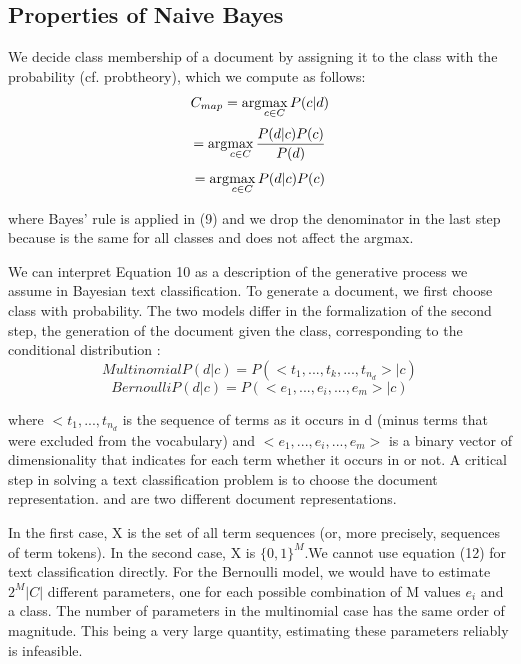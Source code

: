 \documentclass[journal]{IEEEtran}
\begin{document}
\subsection{{Properties of Naive Bayes}}
We decide class membership of a document by assigning it to the class with the probability (cf. probtheory)\cite{nb}, which we compute as follows:
\begin{equation}
	C_{map} = \arg\!\max_{c\in C}P(c|d)
\end{equation}
\begin{equation}
	= \arg\!\max_{c\in C} \dfrac{P(d|c)P(c)}{P(d)}
\end{equation}
\begin{equation}
	= \arg\!\max_{c\in C} {P(d|c)P(c)}
\end{equation}

where Bayes' rule is applied in (9) and we drop the denominator in the last step because is the same for all classes and does not affect the argmax.

We can interpret Equation 10 as a description of the generative process we assume in Bayesian text classification. To generate a document, we first choose class with probability. The two models differ in the formalization of the second step, the generation of the 
document given the class, corresponding to the conditional distribution :
\begin{equation}
	Multinomial P(d|c)=P(<t_{1},...,t_{k},...,t_{n_{d}}>|c)
\end{equation}
\begin{equation}
	Bernoulli P(d|c)=P(<e_{1},...,e_{i},...,e_{m}>|c)
\end{equation}

where $<t_{1},...,t_{n_{d}}$ is the sequence of terms as it occurs in d (minus terms that were excluded from the vocabulary) and ${<e_{1},...,e_{i},...,e_{m}>}$ is a binary vector of dimensionality that indicates for each term whether it occurs in or not.
A critical step in solving a text classification problem is to choose the document representation. and are two different document representations.

In the first case, X is the set of all term sequences (or, more precisely, sequences of term tokens). In the second case, X is $\{0,1\}^{M}$.We cannot use equation (12) for text classification directly. For the Bernoulli model, we would have to estimate ${2^{M}|C|}$ different parameters, one for each possible combination of M values $e_{i}$ and a class. The number of parameters in the multinomial case has the same order of magnitude. This being a very large quantity, estimating these parameters reliably is infeasible.
\end{document}
